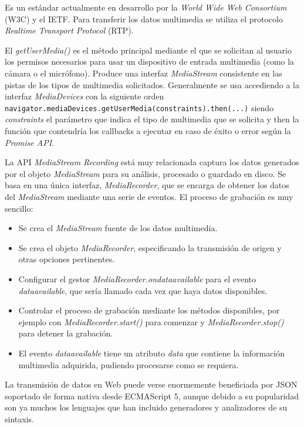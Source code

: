 Es un estándar actualmente en desarrollo por la \emph{World Wide Web Consortium} (\acrshort{W3C}) y el IETF. Para transferir los datos multimedia se utiliza el protocolo \emph{Realtime Transport Protocol }(\acrshort{RTP}).

El \emph{getUserMedia()} es el método principal mediante el que se solicitan al usuario los permisos necesarios para usar un dispositivo de entrada multimedia (como la cámara o el micrófono). Produce una interfaz \emph{MediaStream} consistente en las pistas de los tipos de multimedia solicitados. Generalmente se usa accediendo a la interfaz \emph{MediaDevices} con la siguiente orden \texttt{navigator.mediaDevices.getUserMedia(constraints).then(...)} siendo \emph{constraints} el parámetro que indica el tipo de multimedia que se solicita y then la función que contendría los callbacks a ejecutar en caso de éxito o error según la \emph{Promise API}.

La API \emph{MediaStream Recording} está muy relacionada captura los datos generados por el objeto \emph{MediaStream} para su análisis, procesado o guardado en disco. Se basa en una única interfaz, \emph{MediaRecorder}, que se encarga de obtener los datos del \emph{MediaStream} mediante una serie de eventos. El proceso de grabación es muy sencillo:

\begin{itemize}
\item Se crea el \emph{MediaStream} fuente de los datos multimedia.
\item Se crea el objeto \emph{MediaRecorder}, especificando la transmisión de origen y otras opciones pertinentes.
\item Configurar el gestor \emph{MediaRecorder.ondataavailable} para el evento \emph{dataavailable}, que sería llamado cada vez que haya datos disponibles.
\item Controlar el proceso de grabación mediante los métodos disponibles, por ejemplo con \emph{MediaRecorder.start()} para comenzar y \emph{MediaRecorder.stop()} para detener la grabación.
\item El evento \emph{dataavailable} tiene un atributo \emph{data} que contiene la información multimedia adquirida, pudiendo procesarse como se requiera.
\end{itemize}

La transmisión de datos en Web puede verse enormemente beneficiada por JSON soportado de forma nativa desde ECMAScript 5, aunque debido a su popularidad son ya muchos los lenguajes que han incluido generadores y analizadores de su sintaxis.

